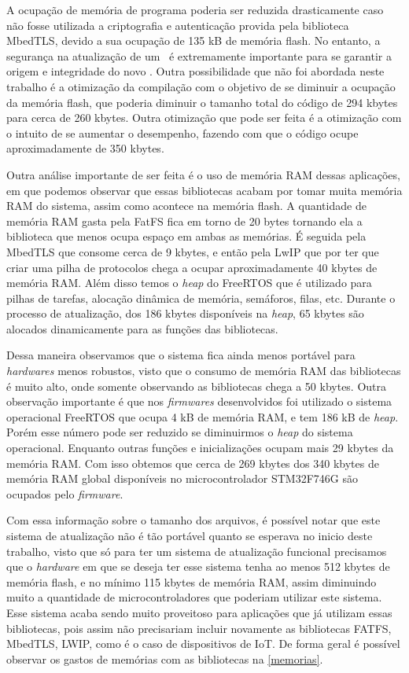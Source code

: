 A ocupação de memória de programa poderia ser reduzida drasticamente caso não fosse utilizada a criptografia e autenticação provida pela biblioteca MbedTLS, devido a sua ocupação de 135 kB de memória flash. No entanto, a segurança na atualização de um \firmware\ é extremamente importante para se garantir a origem e integridade do novo \firmware. Outra possibilidade que não foi abordada neste trabalho é a otimização da compilação com o objetivo de se diminuir a ocupação da memória flash, que poderia diminuir o tamanho total do código de 294 kbytes para cerca de 260 kbytes. Outra otimização que pode ser feita é a otimização com o intuito de se aumentar o desempenho, fazendo com que o código ocupe aproximadamente de 350 kbytes.

Outra análise importante de ser feita é o uso de memória RAM dessas aplicações, em que podemos observar que essas bibliotecas acabam por tomar muita memória RAM do sistema, assim como acontece na memória flash. A quantidade de memória RAM gasta pela FatFS fica em torno de 20 bytes tornando ela a biblioteca que menos ocupa espaço em ambas as memórias. É seguida pela MbedTLS que consome cerca de 9 kbytes, e então pela LwIP que por ter que criar uma pilha de protocolos chega a ocupar aproximadamente 40 kbytes de memória RAM. Além disso temos o \textit{heap} do FreeRTOS que é utilizado para pilhas de tarefas, alocação dinâmica de memória, semáforos, filas, etc. Durante o processo de atualização, dos 186 kbytes disponíveis na \textit{heap}, 65 kbytes são alocados dinamicamente para as funções das bibliotecas.

Dessa maneira observamos que o sistema fica ainda menos portável para \textit{hardwares} menos robustos, visto que o consumo de memória RAM das bibliotecas é muito alto, onde somente observando as bibliotecas chega a 50 kbytes. Outra observação importante é que nos \textit{firmwares} desenvolvidos foi utilizado o sistema operacional FreeRTOS que ocupa 4 kB de memória RAM, e tem 186 kB de \textit{heap}. Porém esse número pode ser reduzido se diminuirmos o \textit{heap} do sistema operacional. Enquanto outras funções e inicializações ocupam mais 29 kbytes da memória RAM. Com isso obtemos que cerca de 269 kbytes dos 340 kbytes de memória RAM global disponíveis no microcontrolador STM32F746G são ocupados pelo \textit{firmware}.

Com essa informação sobre o tamanho dos arquivos, é possível notar que este sistema de atualização não é tão portável quanto se esperava no inicio deste trabalho, visto que só para ter um sistema de atualização funcional precisamos que o \textit{hardware} em que se deseja ter esse sistema tenha ao menos 512 kbytes de memória flash, e no mínimo 115 kbytes de memória RAM, assim diminuindo muito a quantidade de microcontroladores que poderiam utilizar este sistema. Esse sistema acaba sendo muito proveitoso para aplicações que já utilizam essas bibliotecas, pois assim não precisariam incluir novamente as bibliotecas FATFS, MbedTLS, LWIP, como é o caso de dispositivos de IoT. De forma geral é possível observar os gastos de memórias com as bibliotecas na \autoref{memorias}. \newline


